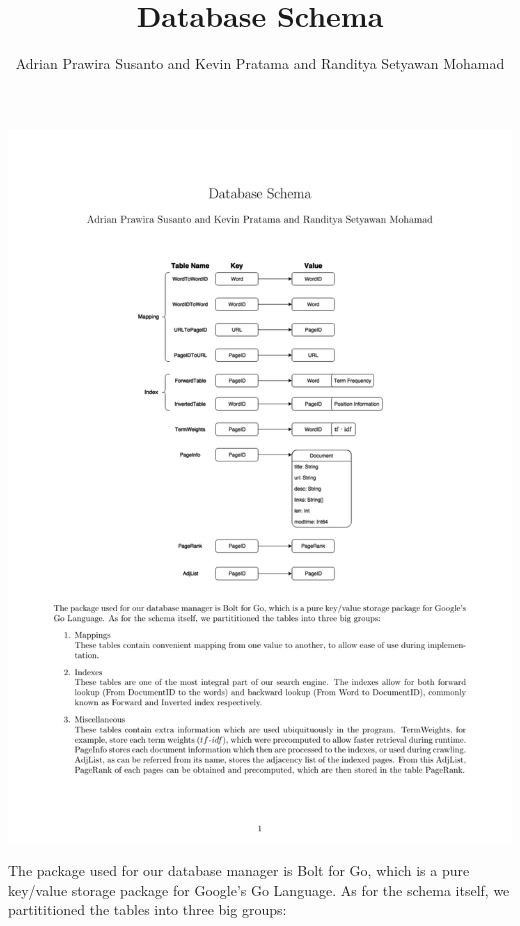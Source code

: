 \documentclass{article}
\title{Database Schema}
\author{Adrian Prawira Susanto and Kevin Pratama and Randitya Setyawan Mohamad}
\date{}
\begin{document}
    \maketitle \medskip
    \begin{center}
        \includegraphics[scale=0.5]{databaseSchema} \\[2\baselineskip]
    \end{center}
    The package used for our database manager is Bolt for Go, which is a pure key/value storage package for Google's Go Language.
    As for the schema itself, we partititioned the tables into three big groups:
\end{document}
